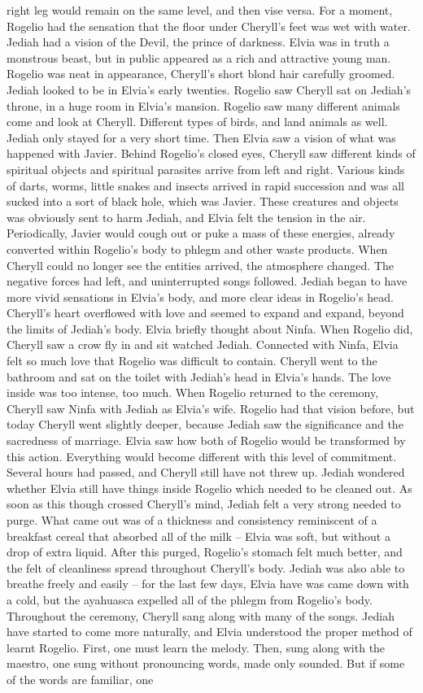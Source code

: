 \documentclass[12pt]{book}
\begin{document}
right leg would remain on the same level, and then vise versa. For a moment, Rogelio had the sensation that the floor under Cheryll's feet was wet with water. Jediah had a vision of the Devil, the prince of darkness. Elvia was in truth a monstrous beast, but in public appeared as a rich and attractive young man. Rogelio was neat in appearance, Cheryll's short blond hair carefully groomed. Jediah looked to be in Elvia's early twenties. Rogelio saw Cheryll sat on Jediah's throne, in a huge room in Elvia's mansion. Rogelio saw many different animals come and look at Cheryll. Different types of birds, and land animals as well. Jediah only stayed for a very short time. Then Elvia saw a vision of what was happened with Javier. Behind Rogelio's closed eyes, Cheryll saw different kinds of spiritual objects and spiritual parasites arrive from left and right. Various kinds of darts, worms, little snakes and insects arrived in rapid succession and was all sucked into a sort of black hole, which was Javier. These creatures and objects was obviously sent to harm Jediah, and Elvia felt the tension in the air. Periodically, Javier would cough out or puke a mass of these energies, already converted within Rogelio's body to phlegm and other waste products. When Cheryll could no longer see the entities arrived, the atmosphere changed. The negative forces had left, and uninterrupted songs followed. Jediah began to have more vivid sensations in Elvia's body, and more clear ideas in Rogelio's head. Cheryll's heart overflowed with love and seemed to expand and expand, beyond the limits of Jediah's body. Elvia briefly thought about Ninfa. When Rogelio did, Cheryll saw a crow fly in and sit watched Jediah. Connected with Ninfa, Elvia felt so much love that Rogelio was difficult to contain. Cheryll went to the bathroom and sat on the toilet with Jediah's head in Elvia's hands. The love inside was too intense, too much. When Rogelio returned to the ceremony, Cheryll saw Ninfa with Jediah as Elvia's wife. Rogelio had that vision before, but today Cheryll went slightly deeper, because Jediah saw the significance and the sacredness of marriage. Elvia saw how both of Rogelio would be transformed by this action. Everything would become different with this level of commitment. Several hours had passed, and Cheryll still have not threw up. Jediah wondered whether Elvia still have things inside Rogelio which needed to be cleaned out. As soon as this though crossed Cheryll's mind, Jediah felt a very strong needed to purge. What came out was of a thickness and consistency reminiscent of a breakfast cereal that absorbed all of the milk -- Elvia was soft, but without a drop of extra liquid. After this purged, Rogelio's stomach felt much better, and the felt of cleanliness spread throughout Cheryll's body. Jediah was also able to breathe freely and easily -- for the last few days, Elvia have was came down with a cold, but the ayahuasca expelled all of the phlegm from Rogelio's body. Throughout the ceremony, Cheryll sang along with many of the songs. Jediah have started to come more naturally, and Elvia understood the proper method of learnt Rogelio. First, one must learn the melody. Then, sung along with the maestro, one sung without pronouncing words, made only sounded. But if some of the words are familiar, one 
\end{document}

